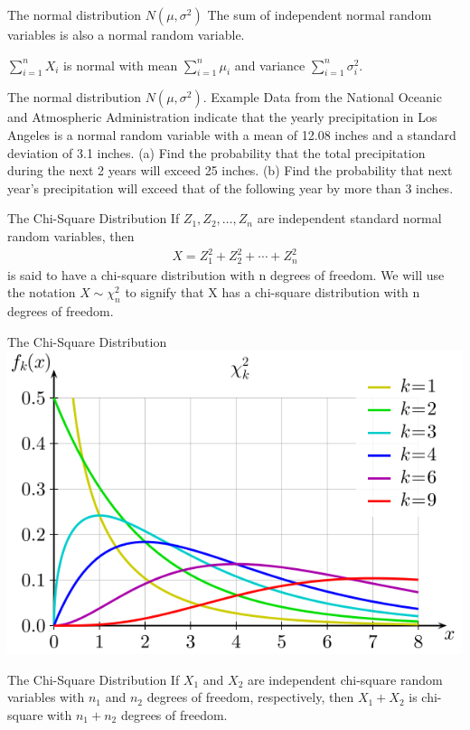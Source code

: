\documentclass{beamer}
\begin{document}
\begin{frame}{The normal distribution $N(\mu,\sigma^2)$}
  The sum of independent normal random variables is also a normal random
  variable.

  $\sum_{i=1}^n X_i$ is normal with mean $\sum_{i=1}^n \mu_i$ and variance
  $\sum_{i=1}^n \sigma_i^2$.
\end{frame}
\begin{frame}[t]{The normal distribution $N(\mu,\sigma^2)$. Example}
  Data from the National Oceanic and Atmospheric Administration indicate that
  the yearly precipitation in Los Angeles is a normal random variable with a
  mean of 12.08 inches and a standard deviation of 3.1 inches. (a) Find the
  probability that the total precipitation during the next 2 years will exceed
  25 inches. (b) Find the probability that next year’s precipitation will exceed
  that of the following year by more than 3 inches.


\end{frame}
\begin{frame}{The Chi-Square Distribution}
  If $Z_1,Z_2 ,\ldots,Z_n$ are independent standard normal random variables,
  then
  \begin{align*}
    X = Z_1^2 + Z_2^2 + \cdots + Z_n^2
  \end{align*}
  is said to have a chi-square distribution with n degrees of freedom. We will
  use the notation $X \sim \chi_n^2$ to signify that X has a chi-square distribution with
  n degrees of freedom.
\end{frame}

\begin{frame}{The Chi-Square Distribution}
  \includegraphics[width=0.8\linewidth]{Chi-square_pdf}
\end{frame}

\begin{frame}{The Chi-Square Distribution}
  If $X_1$ and $X_2$ are independent chi-square random variables with $n_1$ and
  $n_2$ degrees of freedom, respectively, then $X_1 + X_2$ is chi-square with
  $n_1 + n_2$ degrees of freedom.
\end{frame}
\end{document}
